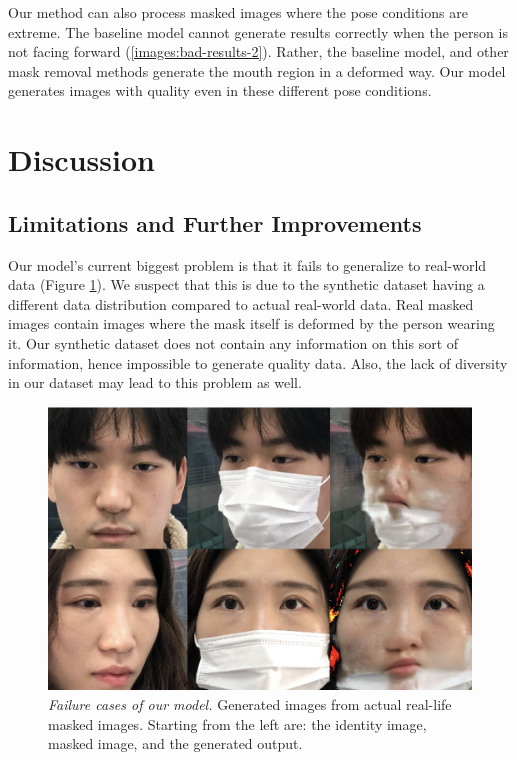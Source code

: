 \documentclass[sigconf,authorversion,nonacm]{acmart}
\begin{document}
Our method can also process masked images where the pose conditions are extreme. The baseline model
cannot generate results correctly when the person is not facing forward (\ref{images:bad-results-2}). Rather, the baseline model, and other mask removal methods generate the mouth region in a deformed way. Our model generates images with quality even in these different pose conditions.




\section{Discussion}
\subsection{Limitations and Further Improvements}
Our model's current biggest problem is that it fails to generalize to real-world data (Figure \ref{images:bad-results}).
We suspect that this is due to the synthetic dataset having a different data distribution compared to actual real-world data. Real masked images contain images where the mask itself is deformed by the person wearing it. Our synthetic dataset does not contain any information on this sort of information, hence impossible to generate quality data.
Also, the lack of diversity in our dataset may lead to this problem as well.

\begin{figure}[ht]
  \centering
  \includegraphics[width=0.8\linewidth]{images/bad-results.png}
  \caption{\emph{Failure cases of our model.} Generated images from actual real-life masked images.
  Starting from the left are: the identity image, masked image, and the generated output.}
  \label{images:bad-results}
\end{figure}
\end{document}
